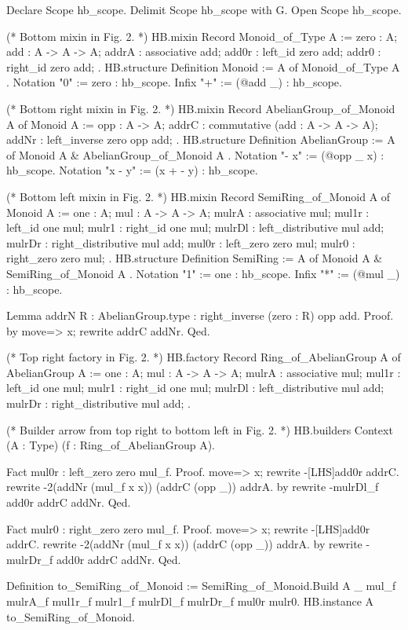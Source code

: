 \documentclass[a4paper,UKenglish,cleveref, autoref]{lipics-v2019}
\theoremstyle{implem}
\theoremstyle{implem}
\theoremstyle{command}
\theoremstyle{commands}
\begin{document}
{{\begin{coqcode}
Declare Scope hb_scope.
Delimit Scope hb_scope with G.
Open Scope hb_scope.

(* Bottom mixin in Fig. 2. *)
HB.mixin Record Monoid_of_Type A := {
  zero : A;
  add : A -> A -> A;
  addrA : associative add;
  add0r : left_id zero add;
  addr0 : right_id zero add;
}.
HB.structure Definition Monoid := { A of Monoid_of_Type A }.
Notation "0" := zero : hb_scope.
Infix "+" := (@add _) : hb_scope.

(* Bottom right mixin in Fig. 2. *)
HB.mixin Record AbelianGroup_of_Monoid A of Monoid A := {
  opp : A -> A;
  addrC : commutative (add : A -> A -> A);
  addNr : left_inverse zero opp add;
}.
HB.structure Definition AbelianGroup := { A of Monoid A & AbelianGroup_of_Monoid A }.
Notation "- x" := (@opp _ x) : hb_scope.
Notation "x - y" := (x + - y) : hb_scope.

(* Bottom left mixin in Fig. 2. *)
HB.mixin Record SemiRing_of_Monoid A of Monoid A := {
  one : A;
  mul : A -> A -> A;
  mulrA : associative mul;
  mul1r : left_id one mul;
  mulr1 : right_id one mul;
  mulrDl : left_distributive mul add;
  mulrDr : right_distributive mul add;
  mul0r : left_zero zero mul;
  mulr0 : right_zero zero mul;
}.
HB.structure Definition SemiRing := { A of Monoid A & SemiRing_of_Monoid A }.
Notation "1" := one : hb_scope.
Infix "*" := (@mul _) : hb_scope.

Lemma addrN {R : AbelianGroup.type} : right_inverse (zero : R) opp add.
Proof. by move=> x; rewrite addrC addNr. Qed.

(* Top right factory in Fig. 2. *)
HB.factory Record Ring_of_AbelianGroup A of AbelianGroup A := {
  one : A;
  mul : A -> A -> A;
  mulrA : associative mul;
  mul1r : left_id one mul;
  mulr1 : right_id one mul;
  mulrDl : left_distributive mul add;
  mulrDr : right_distributive mul add;
}.

(* Builder arrow from top right to bottom left in Fig. 2. *)
HB.builders Context (A : Type) (f : Ring_of_AbelianGroup A).

  Fact mul0r : left_zero zero mul_f.
  Proof.
  move=> x; rewrite -[LHS]add0r addrC.
  rewrite -{2}(addNr (mul_f x x)) (addrC (opp _)) addrA.
  by rewrite -mulrDl_f add0r addrC addNr.
  Qed.

  Fact mulr0 : right_zero zero mul_f.
  Proof.
  move=> x; rewrite -[LHS]add0r addrC.
  rewrite -{2}(addNr (mul_f x x)) (addrC (opp _)) addrA.
  by rewrite -mulrDr_f add0r addrC addNr.
  Qed.

  Definition to_SemiRing_of_Monoid := SemiRing_of_Monoid.Build A _ mul_f mulrA_f
     mul1r_f mulr1_f mulrDl_f mulrDr_f mul0r mulr0.
  HB.instance A to_SemiRing_of_Monoid.


\end{coqcode}}}
\end{document}
